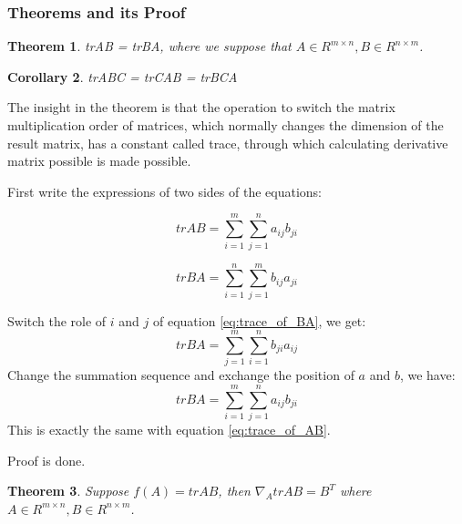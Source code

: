 \documentclass[a4paper]{book}
\newtheorem{theorem}{Theorem}[section]
\newtheorem{corollary}[theorem]{Corollary}
\newenvironment{proof}[1][Proof]{\begin{trivlist}
\item[\hskip \labelsep {\bfseries #1}]}{\end{trivlist}}
\newcommand{\qed}{\nobreak \ifvmode \relax \else
      \ifdim\lastskip<1.5em \hskip-\lastskip
      \hskip1.5em plus0em minus0.5em \fi \nobreak
      \vrule height0.75em width0.5em depth0.25em\fi}
\begin{document}
      \subsubsection{Theorems and its Proof}

      \begin{theorem}
        trAB = trBA, where we suppose that $A \in R^{m \times n}, B \in R^{n
          \times m}$.
      \end{theorem}

      \begin{corollary}
        trABC = trCAB = trBCA
      \end{corollary}

      The insight in the theorem is that the operation to switch the
      matrix multiplication order of matrices, which normally changes
      the dimension of the result matrix, has a constant called trace,
      through which calculating derivative matrix possible is made
      possible.

      \begin{proof}
        First write the expressions of two sides of the equations:


        \begin{equation}
          trAB = \sum\limits^{m}_{i=1}\sum\limits^{n}_{j=1}a_{ij}b_{ji}
          \label{eq:trace_of_AB}
        \end{equation}

        \begin{equation}
          trBA = \sum\limits^{n}_{i=1}\sum\limits^{m}_{j=1}b_{ij}a_{ji}
          \label{eq:trace_of_BA}
        \end{equation}

        Switch the role of $i$ and $j$ of equation \ref{eq:trace_of_BA}, we get:
        \begin{displaymath}
          trBA = \sum\limits^{m}_{j=1}\sum\limits^{n}_{i=1}b_{ji}a_{ij}
        \end{displaymath}
        Change the summation sequence and exchange the position of $a$ and
        $b$, we have:
        \begin{displaymath}
          trBA = \sum\limits^{m}_{i=1}\sum\limits^{n}_{j=1}a_{ij}b_{ji}
        \end{displaymath}
        This is exactly the same with equation \ref{eq:trace_of_AB}.

        Proof is done.\qed
      \end{proof}

      \begin{theorem}
        Suppose $f(A) = trAB$, then $\nabla_A trAB = B^T$ where $A \in R^{m
          \times n}, B \in R^{n \times m}$.
        \label{thm:trAB_=_B^T}
      \end{theorem}
\end{document}
